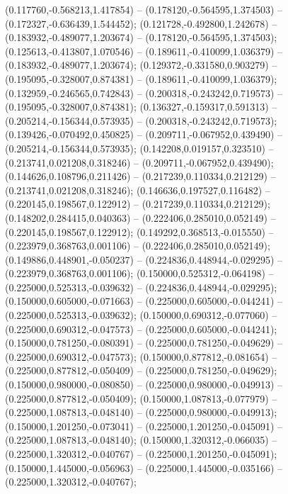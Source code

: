  (0.117760,-0.568213,1.417854) -- (0.178120,-0.564595,1.374503) -- (0.172327,-0.636439,1.544452);
 (0.121728,-0.492800,1.242678) -- (0.183932,-0.489077,1.203674) -- (0.178120,-0.564595,1.374503);
 (0.125613,-0.413807,1.070546) -- (0.189611,-0.410099,1.036379) -- (0.183932,-0.489077,1.203674);
 (0.129372,-0.331580,0.903279) -- (0.195095,-0.328007,0.874381) -- (0.189611,-0.410099,1.036379);
 (0.132959,-0.246565,0.742843) -- (0.200318,-0.243242,0.719573) -- (0.195095,-0.328007,0.874381);
 (0.136327,-0.159317,0.591313) -- (0.205214,-0.156344,0.573935) -- (0.200318,-0.243242,0.719573);
 (0.139426,-0.070492,0.450825) -- (0.209711,-0.067952,0.439490) -- (0.205214,-0.156344,0.573935);
 (0.142208,0.019157,0.323510) -- (0.213741,0.021208,0.318246) -- (0.209711,-0.067952,0.439490);
 (0.144626,0.108796,0.211426) -- (0.217239,0.110334,0.212129) -- (0.213741,0.021208,0.318246);
 (0.146636,0.197527,0.116482) -- (0.220145,0.198567,0.122912) -- (0.217239,0.110334,0.212129);
 (0.148202,0.284415,0.040363) -- (0.222406,0.285010,0.052149) -- (0.220145,0.198567,0.122912);
 (0.149292,0.368513,-0.015550) -- (0.223979,0.368763,0.001106) -- (0.222406,0.285010,0.052149);
 (0.149886,0.448901,-0.050237) -- (0.224836,0.448944,-0.029295) -- (0.223979,0.368763,0.001106);
 (0.150000,0.525312,-0.064198) -- (0.225000,0.525313,-0.039632) -- (0.224836,0.448944,-0.029295);
 (0.150000,0.605000,-0.071663) -- (0.225000,0.605000,-0.044241) -- (0.225000,0.525313,-0.039632);
 (0.150000,0.690312,-0.077060) -- (0.225000,0.690312,-0.047573) -- (0.225000,0.605000,-0.044241);
 (0.150000,0.781250,-0.080391) -- (0.225000,0.781250,-0.049629) -- (0.225000,0.690312,-0.047573);
 (0.150000,0.877812,-0.081654) -- (0.225000,0.877812,-0.050409) -- (0.225000,0.781250,-0.049629);
 (0.150000,0.980000,-0.080850) -- (0.225000,0.980000,-0.049913) -- (0.225000,0.877812,-0.050409);
 (0.150000,1.087813,-0.077979) -- (0.225000,1.087813,-0.048140) -- (0.225000,0.980000,-0.049913);
 (0.150000,1.201250,-0.073041) -- (0.225000,1.201250,-0.045091) -- (0.225000,1.087813,-0.048140);
 (0.150000,1.320312,-0.066035) -- (0.225000,1.320312,-0.040767) -- (0.225000,1.201250,-0.045091);
 (0.150000,1.445000,-0.056963) -- (0.225000,1.445000,-0.035166) -- (0.225000,1.320312,-0.040767);
